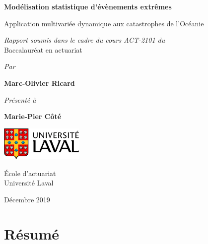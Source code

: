\documentclass[11pt]{report}
\numberwithin{equation}{section}
\begin{document}



\begin{titlepage}
    \begin{center}
        \vspace*{1cm}
        
        \Large
        \textbf{Modélisation statistique d'évènements extrêmes}
        
        \large
        \vspace{0.4cm}
        
        Application multivariée dynamique aux catastrophes de l'Océanie
 
        \vspace{3cm}
 
        \textit{Rapport soumis dans le cadre du cours ACT-2101 du} \\
        Baccalauréat en actuariat
 
        \vspace{1cm}
        
        \textit{Par}
 
        \textbf{Marc-Olivier Ricard}
        
        \vspace{1cm}
        
        \textit{Présenté à}
 
        \textbf{Marie-Pier Côté}
 
        \vfill
 
        \includegraphics[width=0.3\textwidth]{Laval.PNG}
        
        \vspace{1.5cm}
 
        École d'actuariat\\
        Université Laval\\
        
        \vspace{0.5cm}
        
        Décembre 2019
 
    \end{center}
\end{titlepage}


\tableofcontents
\cleardoublepage


\chapter*{Résumé}
\label{chap:résumé} 
\end{document}
